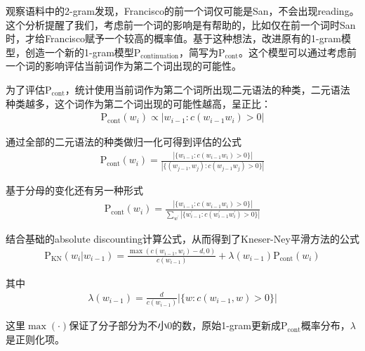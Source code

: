 \parinterval 观察语料中的2-gram发现，Francisco的前一个词仅可能是San，不会出现reading。这个分析提醒了我们，考虑前一个词的影响是有帮助的，比如仅在前一个词时San时，才给Francisco赋予一个较高的概率值。基于这种想法，改进原有的1-gram模型，创造一个新的1-gram模型$\textrm{P}_{\textrm{continuation}}$，简写为$\textrm{P}_{\textrm{cont}}$。这个模型可以通过考虑前一个词的影响评估当前词作为第二个词出现的可能性。

\parinterval 为了评估$\textrm{P}_{\textrm{cont}}$，统计使用当前词作为第二个词所出现二元语法的种类，二元语法种类越多，这个词作为第二个词出现的可能性越高，呈正比：
\begin{eqnarray}
\textrm{P}_{\textrm{cont}}(w_i) \varpropto |w_{i-1}: c(w_{i-1} w_i )>0|
\label{eq:2-34}
\end{eqnarray}

通过全部的二元语法的种类做归一化可得到评估的公式
\begin{eqnarray}
\textrm{P}_{\textrm{cont}}(w_i) = \frac{|\{ w_{i-1}:c(w_{i-1} w_i )>0 \}|}{|\{ (w_{j-1}, w_j):c(w_{j-1}w_j )>0 \}|}
\label{eq:2-35}
\end{eqnarray}

\parinterval 基于分母的变化还有另一种形式
\begin{eqnarray}
\textrm{P}_{\textrm{cont}}(w_i) = \frac{|\{ w_{i-1}:c(w_{i-1} w_i )>0 \}|}{\sum_{w^{\prime}}|\{ w_{i-1}^{\prime}:c(w_{i-1}^{\prime} w_i^{\prime} )>0 \}|}
\label{eq:2-36}
\end{eqnarray}

结合基础的absolute discounting计算公式，从而得到了Kneser-Ney平滑方法的公式
\begin{eqnarray}
\textrm{P}_{\textrm{KN}}(w_i|w_{i-1}) = \frac{\max(c(w_{i-1},w_i )-d,0)}{c(w_{i-1})}+ \lambda(w_{i-1})\textrm{P}_{\textrm{cont}}(w_i)
\label{eq:2-37}
\end{eqnarray}

\noindent 其中
\begin{eqnarray}
\lambda(w_{i-1}) = \frac{d}{c(w_{i-1})}|\{w:c(w_{i-1},w)>0\}|
\label{eq:2-38}
\end{eqnarray}

\noindent 这里$\max(\cdot)$保证了分子部分为不小0的数，原始1-gram更新成$\textrm{P}_{\textrm{cont}}$概率分布，$\lambda$是正则化项。

